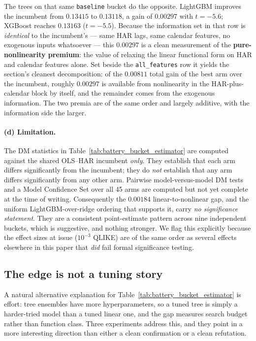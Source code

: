 The trees on that same \texttt{baseline} bucket do the opposite. LightGBM
improves the incumbent from $0.13415$ to $0.13118$, a gain of $0.00297$ with
$t = -5.6$; XGBoost reaches $0.13163$ ($t = -5.5$). Because the information set
in that row is \emph{identical} to the incumbent's --- same HAR lags, same
calendar features, no exogenous inputs whatsoever --- this $0.00297$ is a clean
measurement of the \textbf{pure-nonlinearity premium}: the value of relaxing the
linear functional form on HAR and calendar features alone. Set beside the
\texttt{all\_features} row it yields the section's cleanest decomposition: of the
$0.00811$ total gain of the best arm over the incumbent, roughly $0.00297$ is
available from nonlinearity in the HAR-plus-calendar block by itself, and the
remainder comes from the exogenous information. The two premia are of the same
order and largely additive, with the information side the larger.

\paragraph{(d) Limitation.}
The DM statistics in Table~\ref{tab:battery_bucket_estimator} are computed
against the shared OLS--HAR incumbent \emph{only}. They establish that each arm
differs significantly from the incumbent; they do \emph{not} establish that any
arm differs significantly from any other arm. Pairwise model-versus-model DM
tests and a Model Confidence Set \citep{HansenLundeNason2011} over all 45 arms
are computed but not yet complete at the time of writing. Consequently the
$0.00184$ linear-to-nonlinear gap, and the uniform LightGBM-over-ridge ordering
that supports it, carry \emph{no significance statement}. They are a consistent
point-estimate pattern across nine independent buckets, which is suggestive, and
nothing stronger. We flag this explicitly because the effect sizes at issue
($10^{-3}$ QLIKE) are of the same order as several effects elsewhere in this
paper that \emph{did} fail formal significance testing.

\subsection{The edge is not a tuning story}
\label{sec:linvsnonlin_tuning}

A natural alternative explanation for Table~\ref{tab:battery_bucket_estimator} is
effort: tree ensembles have more hyperparameters, so a tuned tree is simply a
harder-tried model than a tuned linear one, and the gap measures search budget
rather than function class. Three experiments address this, and they point in a
more interesting direction than either a clean confirmation or a clean refutation.

